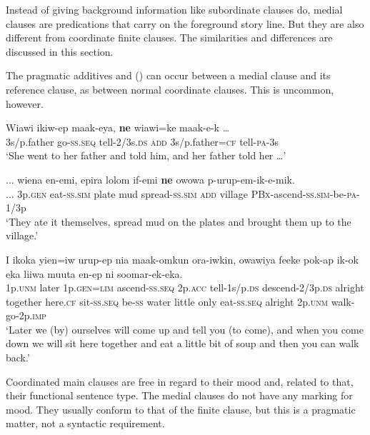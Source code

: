 Instead of giving background information like subordinate clauses do, medial clauses are predications that carry on the foreground story line. But they are also different from coordinate finite clauses. The similarities and differences are discussed in this section.

The pragmatic additives  and  () can occur between a medial clause and its reference clause, as between normal coordinate clauses. This is uncommon, however.

\ea%
\label{ex:8:x1444}
\gll Wiawi  ikiw-ep  maak-eya,  \textbf{ne}  wiawi=ke  maak-e-k  {\dots} \\
3s/p.father  go-\textsc{ss}.\textsc{seq} tell-2/3s.\textsc{ds} \textsc{add}  3s/p.father=\textsc{cf} tell-\textsc{pa}-3s\\
\glt`She went to her father and told him, and her father told her {\dots}'
\z


\ea%
\label{ex:8:x1445}
\gll ...  wiena  en-emi,  epira  lolom  if-emi  \textbf{ne}  owowa p-urup-em-ik-e-mik.\\
...  3p.\textsc{gen} eat-\textsc{ss}.\textsc{sim} plate  mud  spread-\textsc{ss}.\textsc{sim} \textsc{add} village \textsc{PBx}-ascend-\textsc{ss}.\textsc{sim}-be-\textsc{pa}-1/3p\\
\glt`They ate it themselves, spread mud on the plates and brought them up to the village.'
\z


\ea%
\label{ex:8:x1442}
\gll I  ikoka  yien=iw  urup-ep  nia  maak-omkun ora-iwkin,    owawiya  feeke  pok-ap  ik-ok  eka liiwa  muuta  en-ep    ni  soomar-ek-eka.\\
1p.\textsc{unm} later 1p.\textsc{gen}=\textsc{lim} ascend-\textsc{ss}.\textsc{seq} 2p.\textsc{acc} tell-1s/p.\textsc{ds} descend-2/3p.\textsc{ds} alright together here.\textsc{cf} sit-\textsc{ss}.\textsc{seq} be-\textsc{ss} water little  only  eat-\textsc{ss}.\textsc{seq} alright  2p.\textsc{unm} walk-go-2p.\textsc{imp}\\
\glt`Later we (by) ourselves will come up and tell you (to come), and when you come down we will sit here together and eat a little bit of soup and then you can walk back.'
\z


Coordinated main clauses are free in regard to their mood and, related to that, their functional sentence type. The medial clauses do not have any marking for mood.  They usually conform to that of the finite clause, but this is a pragmatic matter, not a syntactic requirement. 

